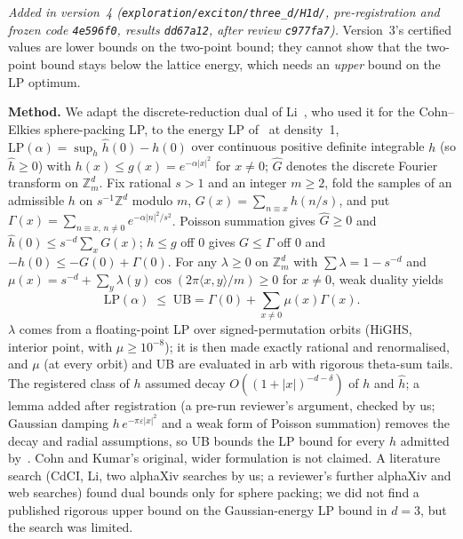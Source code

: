 \emph{Added in version~4 (\texttt{exploration/exciton/three\_d/H1d/}, pre-registration and frozen code \texttt{4e596f0}, results
\texttt{dd67a12}, after review \texttt{c977fa7}).} Version~3's certified values are lower bounds on the two-point bound; they
cannot show that the two-point bound stays below the lattice energy, which needs an \emph{upper} bound on the LP optimum.

\textbf{Method.} We adapt the discrete-reduction dual of Li~\cite{Li22}, who used it for the Cohn--Elkies sphere-packing LP, to
the energy LP of~\cite[Prop.~2.2]{CdCI16} at density~1, $\mathrm{LP}(\alpha)=\sup_h \hat h(0)-h(0)$ over continuous positive
definite integrable $h$ (so $\hat h\ge0$) with $h(x)\le g(x)=e^{-\alpha|x|^2}$ for $x\ne0$; $\hat G$ denotes the discrete
Fourier transform on $\mathbb Z_m^d$. Fix rational $s>1$ and an
integer $m\ge2$, fold the samples of an admissible $h$ on $s^{-1}\mathbb Z^d$ modulo $m$, $G(x)=\sum_{n\equiv x}h(n/s)$, and put
$\Gamma(x)=\sum_{n\equiv x,\,n\ne0}e^{-\alpha|n|^2/s^2}$. Poisson summation gives $\hat G\ge0$ and $\hat h(0)\le s^{-d}\sum_xG(x)$;
$h\le g$ off $0$ gives $G\le\Gamma$ off $0$ and $-h(0)\le-G(0)+\Gamma(0)$. For any $\lambda\ge0$ on $\mathbb Z_m^d$ with
$\sum\lambda=1-s^{-d}$ and $\mu(x)=s^{-d}+\sum_y\lambda(y)\cos(2\pi\langle x,y\rangle/m)\ge0$ for $x\ne0$, weak duality yields
\[
\mathrm{LP}(\alpha)\;\le\;\mathrm{UB}=\Gamma(0)+\sum_{x\ne0}\mu(x)\Gamma(x).
\]
$\lambda$ comes from a floating-point LP over signed-permutation orbits (HiGHS, interior point, with $\mu\ge10^{-8}$); it is then
made exactly rational and renormalised, and $\mu$ (at every orbit) and UB are evaluated in arb with rigorous theta-sum tails. The
registered class of $h$ assumed decay $O((1+|x|)^{-d-\delta})$ of $h$ and $\hat h$; a lemma added after registration (a pre-run
reviewer's argument, checked by us; Gaussian damping $h\,e^{-\pi\varepsilon|x|^2}$ and a weak form of Poisson summation) removes
the decay and radial assumptions, so UB bounds the LP bound for every $h$ admitted by~\cite[Prop.~2.2]{CdCI16}. Cohn and
Kumar's original, wider formulation is not claimed. A literature search (CdCI, Li, two alphaXiv searches by us; a reviewer's further alphaXiv and web searches) found
dual bounds only for sphere packing; we did not find a published rigorous upper bound on the Gaussian-energy LP bound in
$d=3$, but the search was limited.


